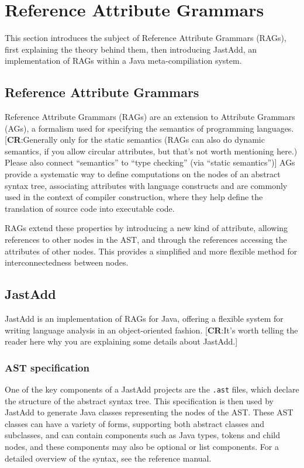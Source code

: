 \documentclass[nofilelist]{cslthse-msc}
\newcommand{\CR}[1]{\textcolor{green!60!black}{[\textbf{CR}:#1]}}
\begin{document}
\section{Reference Attribute Grammars}
This section introduces the subject of Reference Attribute Grammars (RAGs), first explaining the theory behind them, then introducing JastAdd, an implementation of RAGs within a Java meta-compiliation system\cite{jastadd}.

\subsection{Reference Attribute Grammars}
Reference Attribute Grammars (RAGs) are an extension to Attribute Grammars (AGs), a formalism used for specifying the semantics of programming languages.
\CR{Generally only for the static semantics (RAGs can also do dynamic semantics, if you allow circular attributes, but that's not worth mentioning here.)
Please also connect ``semantics'' to ``type checking'' (via ``static semantics'')}
AGs provide a systematic way to define computations on the nodes of an abstract syntax tree, associating attributes with language constructs and are commonly used in the context of compiler construction, where they help define the translation of source code into executable code\cite{AGs}.

RAGs extend these properties by introducing a new kind of attribute, allowing references to other nodes in the AST, and through the references accessing the attributes of other nodes.
This provides a simplified and more flexible method for interconnectedness between nodes\cite{RAG}.

\subsection{JastAdd}
JastAdd is an implementation of RAGs for Java, offering a flexible system for writing language analysis in an object-oriented fashion.
\CR{It's worth telling the reader here why you are explaining some details about JastAdd.}

\cite{JastAdd}
\subsubsection{AST specification}\label{astdef}
One of the key components of a JastAdd projects are the \verb|.ast| files, which declare the structure of the abstract syntax tree.
This specification is then used by JastAdd to generate Java classes representing the nodes of the AST.
These AST classes can have a variety of forms, supporting both abstract classes and subclasses, and can contain components such as Java types, tokens and child nodes, and these components may also be optional or list components.
For a detailed overview of the syntax, see the reference manual\cite{jastaddref}.
\end{document}
